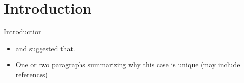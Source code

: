 \section{Introduction}

\begin{frame}{Introduction}
    
\begin{itemize}
    \item \parencite{dass2012ocular} and \parencite{almahmoud2019epidemiology} suggested that.
    \item One or two paragraphs summarizing why this case is unique (may include references)
\end{itemize}

\end{frame}
